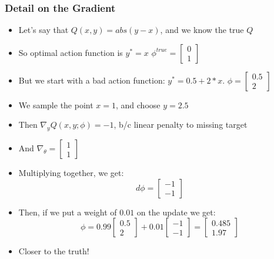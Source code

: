 \documentclass{beamer}
\begin{document}
\begin{frame}
\frametitle[alignment=center]{Detail on the Gradient}
\begin{itemize}
\item Let's say that $Q(x,y)=abs(y-x)$, and we know the true $Q$
\item So optimal action function is $y^*=x$ $\phi^{true}=\left[\begin{array}{c}0 \\ 1\end{array}\right]$
\item But we start with a bad action function: $y^*=0.5+2*x$.  $\phi=\left[\begin{array}{c}0.5 \\ 2\end{array}\right]$
\item We sample the point $x=1$, and choose $y=2.5$
\item Then $\nabla_yQ(x,y;\phi)=-1$, b/c linear penalty to missing target
\item And $\nabla_\theta=\left[\begin{array}{c}1 \\ 1\end{array}\right]$
\item Multiplying together, we get:
$$d\phi = \left[\begin{array}{c}-1 \\ -1\end{array}\right]$$
\item Then, if we put a weight of $0.01$ on the update we get:
$$\phi=0.99\left[\begin{array}{c}0.5 \\ 2\end{array}\right]+0.01\left[\begin{array}{c}-1 \\ -1\end{array}\right]=\left[\begin{array}{c}0.485 \\ 1.97\end{array}\right]$$
\item Closer to the truth!
\end{itemize}
\end{frame}
\end{document}
